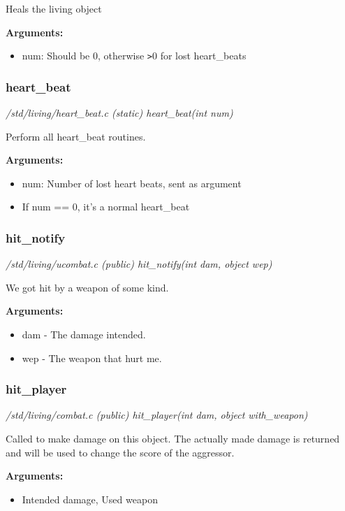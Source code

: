 Heals the living object

{\bf Arguments:}
\begin{itemize}
\item      num: Should be 0, otherwise \verb+>+0 for lost heart\_beats
\end{itemize}


\subsubsection{heart\_beat}

{\em /std/living/heart\_beat.c (static) heart\_beat(int num)}

Perform all heart\_beat routines.

{\bf Arguments:}
\begin{itemize}
\item        num: Number of lost heart beats, sent as argument
\item If num == 0, it's a normal heart\_beat
\end{itemize}


\subsubsection{hit\_notify}

{\em /std/living/ucombat.c (public) hit\_notify(int dam, object wep)}

We got hit by a weapon of some kind.

{\bf Arguments:}
\begin{itemize}
\item     dam - The damage intended.
\item wep - The weapon that hurt me.
\end{itemize}

\subsubsection{hit\_player}

{\em /std/living/combat.c (public) hit\_player(int dam, object with\_weapon)}

Called to make damage on this object. The actually
made damage is returned and will be used to change
the score of the aggressor.

{\bf Arguments:}
\begin{itemize}
\item     Intended damage, Used weapon
\end{itemize}

